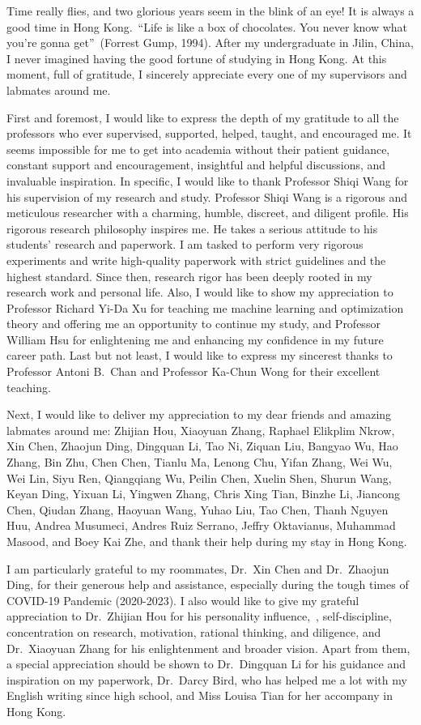 \begin{acknowledgement}
Time really flies, and two glorious years seem in the blink of an eye! It is always a good time in Hong Kong.~``Life is like a box of chocolates. You never know what you're gonna get''~(Forrest Gump, 1994). After my undergraduate in Jilin, China, I never imagined having the good fortune of studying in Hong Kong. At this moment, full of gratitude, I sincerely appreciate every one of my supervisors and labmates around me.

First and foremost, I would like to express the depth of my gratitude to all the professors who ever supervised, supported, helped, taught, and encouraged me. It seems impossible for me to get into academia without their patient guidance, constant support and encouragement, insightful and helpful discussions, and invaluable inspiration. In specific, I would like to thank Professor Shiqi Wang for his supervision of my research and study. Professor Shiqi Wang is a rigorous and meticulous researcher with a charming, humble, discreet, and diligent profile. His rigorous research philosophy inspires me. He takes a serious attitude to his students' research and paperwork. I am tasked to perform very rigorous experiments and write high-quality paperwork with strict guidelines and the highest standard. Since then, research rigor has been deeply rooted in my research work and personal life. Also, I would like to show my appreciation to Professor Richard Yi-Da Xu for teaching me machine learning and optimization theory and offering me an opportunity to continue my study, and Professor William Hsu for enlightening me and enhancing my confidence in my future career path. Last but not least, I would like to express my sincerest thanks to Professor Antoni B.~Chan and Professor Ka-Chun Wong for their excellent teaching.

Next, I would like to deliver my appreciation to my dear friends and amazing labmates around me: Zhijian Hou, Xiaoyuan Zhang, Raphael Elikplim Nkrow, Xin Chen, Zhaojun Ding, Dingquan Li, Tao Ni, Ziquan Liu, Bangyao Wu, Hao Zhang, Bin Zhu, Chen Chen, Tianlu Ma, Lenong Chu, Yifan Zhang, Wei Wu, Wei Lin, Siyu Ren, Qiangqiang Wu, Peilin Chen, Xuelin Shen, Shurun Wang, Keyan Ding, Yixuan Li, Yingwen Zhang, Chris Xing Tian, Binzhe Li, Jiancong Chen, Qiudan Zhang, Haoyuan Wang, Yuhao Liu, Tao Chen, Thanh Nguyen Huu, Andrea Musumeci, Andres Ruiz Serrano, Jeffry Oktavianus, Muhammad Masood, and Boey Kai Zhe, and thank their help during my stay in Hong Kong.

I am particularly grateful to my roommates, Dr.~Xin Chen and Dr.~Zhaojun Ding, for their generous help and assistance, especially during the tough times of COVID-19 Pandemic (2020-2023). I also would like to give my grateful appreciation to Dr.~Zhijian Hou for his personality influence,~\eg, self-discipline, concentration on research, motivation, rational thinking, and diligence, and Dr.~Xiaoyuan Zhang for his enlightenment and broader vision. Apart from them, a special appreciation should be shown to Dr.~Dingquan Li for his guidance and inspiration on my paperwork, Dr.~Darcy Bird, who has helped me a lot with my English writing since high school, and Miss Louisa Tian for her accompany in Hong Kong.


\end{acknowledgement}
